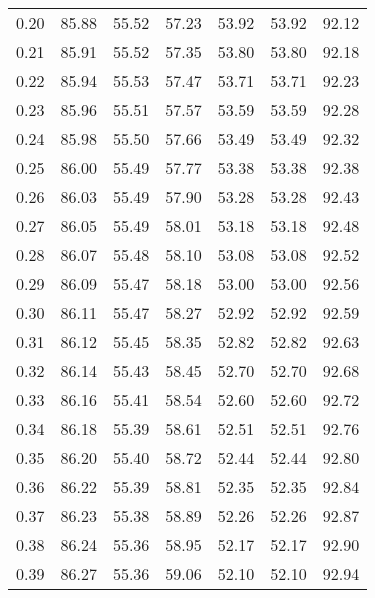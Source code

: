 \begin{tabular}{|c|c|c|c|c|c|c|}
      0.20 &     85.88 &     55.52 &      57.23 &   53.92 &      53.92 &         92.12 \\
      0.21 &     85.91 &     55.52 &      57.35 &   53.80 &      53.80 &         92.18 \\
      0.22 &     85.94 &     55.53 &      57.47 &   53.71 &      53.71 &         92.23 \\
      0.23 &     85.96 &     55.51 &      57.57 &   53.59 &      53.59 &         92.28 \\
      0.24 &     85.98 &     55.50 &      57.66 &   53.49 &      53.49 &         92.32 \\
      0.25 &     86.00 &     55.49 &      57.77 &   53.38 &      53.38 &         92.38 \\
      0.26 &     86.03 &     55.49 &      57.90 &   53.28 &      53.28 &         92.43 \\
      0.27 &     86.05 &     55.49 &      58.01 &   53.18 &      53.18 &         92.48 \\
      0.28 &     86.07 &     55.48 &      58.10 &   53.08 &      53.08 &         92.52 \\
      0.29 &     86.09 &     55.47 &      58.18 &   53.00 &      53.00 &         92.56 \\
      0.30 &     86.11 &     55.47 &      58.27 &   52.92 &      52.92 &         92.59 \\
      0.31 &     86.12 &     55.45 &      58.35 &   52.82 &      52.82 &         92.63 \\
      0.32 &     86.14 &     55.43 &      58.45 &   52.70 &      52.70 &         92.68 \\
      0.33 &     86.16 &     55.41 &      58.54 &   52.60 &      52.60 &         92.72 \\
      0.34 &     86.18 &     55.39 &      58.61 &   52.51 &      52.51 &         92.76 \\
      0.35 &     86.20 &     55.40 &      58.72 &   52.44 &      52.44 &         92.80 \\
      0.36 &     86.22 &     55.39 &      58.81 &   52.35 &      52.35 &         92.84 \\
      0.37 &     86.23 &     55.38 &      58.89 &   52.26 &      52.26 &         92.87 \\
      0.38 &     86.24 &     55.36 &      58.95 &   52.17 &      52.17 &         92.90 \\
      0.39 &     86.27 &     55.36 &      59.06 &   52.10 &      52.10 &         92.94 \\

\end{tabular}
